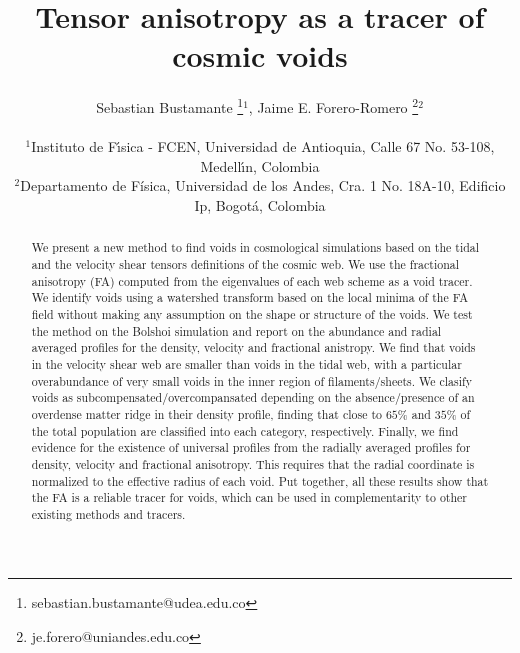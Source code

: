 \documentclass[a4,useAMS,usenatbib,usegraphicx]{mn2e}
\begin{document}
\title{Tensor anisotropy as a tracer of cosmic voids}
\author[S. Bustamante and J.E. Forero-Romero]{
\parbox[t]{\textwidth}{\raggedright 
  Sebastian Bustamante \thanks{sebastian.bustamante@udea.edu.co}$^{1}$,
  Jaime E. Forero-Romero \thanks{je.forero@uniandes.edu.co}$^{2}$ 
}
\vspace*{6pt}\\
$^1$Instituto de F\'{\i}sica - FCEN, Universidad de Antioquia, Calle
67 No. 53-108, Medell\'{\i}n, Colombia\\ 
$^2$Departamento de F\'{i}sica, Universidad de los Andes, Cra. 1
No. 18A-10, Edificio Ip, Bogot\'a, Colombia
}

\maketitle

\begin{abstract}
We present a new method to find voids in cosmological simulations
based on the tidal and the velocity shear tensors
definitions of the cosmic web. 
We use the fractional anisotropy (FA) computed from the eigenvalues
of each web scheme as a void tracer.
We identify voids using a watershed transform based on the local
minima of the FA field without making any assumption on the shape or
structure of the voids.  
We test the method on the Bolshoi simulation and report on the
abundance and radial averaged profiles for the density, velocity and
fractional anistropy.
We find that voids in the velocity shear web are smaller than voids in
the tidal web, with a particular overabundance of very small voids in
the inner region of filaments/sheets.
We clasify voids as subcompensated/overcompansated depending on the
absence/presence of an overdense matter ridge in their density
profile, finding that close to $65\%$ and $35\%$ of the total
population are classified into each category, respectively.
Finally, we find evidence for the existence of universal profiles from
the radially averaged profiles for density, velocity and fractional
anisotropy. 
This requires that the radial coordinate is normalized to the
effective radius of each void. 
Put together, all these results show that the FA is a reliable tracer
for voids, which can be used in complementarity to other existing
methods and tracers.
\end{abstract}
\end{document}

